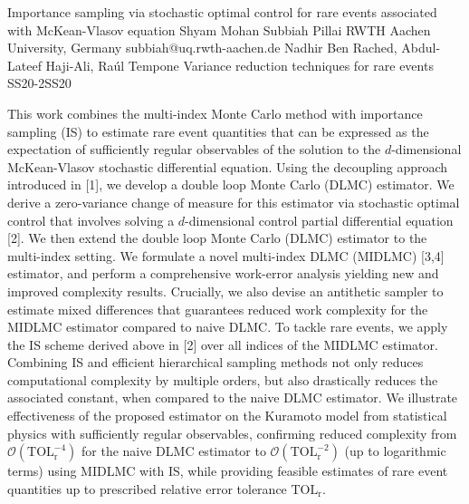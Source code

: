 \begin{talk}
  {Importance sampling via stochastic optimal control for rare events associated with McKean-Vlasov equation}%
  {Shyam Mohan Subbiah Pillai}%
  {RWTH Aachen University, Germany}%
  {subbiah@uq.rwth-aachen.de}%
  {Nadhir Ben Rached, Abdul-Lateef Haji-Ali, Ra\'ul Tempone}%
{Variance reduction techniques for rare events}
{}{SS20-2}{SS20}

			
This work combines the multi-index Monte Carlo method with importance sampling (IS) to estimate rare event quantities that can be expressed as the expectation of sufficiently regular observables of the solution to the $d$-dimensional McKean-Vlasov stochastic differential equation. Using the decoupling approach introduced in [1], we develop a double loop Monte Carlo (DLMC) estimator. We derive a zero-variance change of measure for this estimator via stochastic optimal control that involves solving a $d$-dimensional control partial differential equation [2]. We then extend the double loop Monte Carlo (DLMC) estimator to the multi-index setting. We formulate a  novel multi-index DLMC (MIDLMC) [3,4] estimator, and perform a comprehensive work-error analysis yielding new and improved complexity results. Crucially, we also devise an antithetic sampler to estimate mixed differences that guarantees reduced work complexity for the  MIDLMC estimator compared to naive DLMC. To tackle rare events, we apply the IS scheme derived above in [2] over all indices of the MIDLMC estimator. Combining IS and efficient hierarchical sampling methods not only reduces computational complexity by multiple orders, but also drastically reduces the associated constant, when compared to the naive DLMC estimator. We illustrate effectiveness of the proposed estimator on the Kuramoto model from statistical physics with sufficiently regular observables, confirming reduced complexity from $\mathcal{O}(\mathrm{TOL}_{\mathrm{r}}^{-4})$ for the naive DLMC estimator to $\mathcal{O}(\mathrm{TOL}_{\mathrm{r}}^{-2})$ (up to logarithmic terms) using MIDLMC with IS, while providing feasible estimates of rare event quantities up to prescribed relative error tolerance $\mathrm{TOL}_{\mathrm{r}}$.

\medskip


\end{talk}
